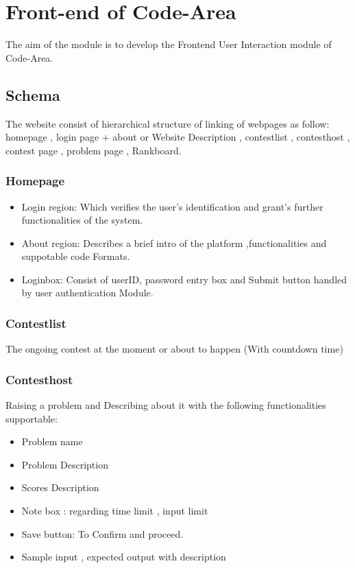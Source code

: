 

\newpage

\section{Front-end of Code-Area}
The aim of the module is to develop the Frontend User Interaction module of Code-Area.

\subsection{Schema}
The website consist of hierarchical structure of linking of webpages as follow:
homepage , login page + about or Website Description , contestlist , contesthost , contest page , problem page , Rankboard.

\subsubsection{Homepage}
\begin{itemize}

\item Login region: Which verifies the user’s identification and grant’s further functionalities of the system.
\item About region: Describes a brief intro of the platform ,functionalities and suppotable code Formats.
\item Loginbox: Consist of userID, password entry box and Submit button handled by user authentication Module.

\end{itemize}

\subsubsection{Contestlist}
The ongoing contest at the moment or about to happen (With countdown time)

\subsubsection{Contesthost}
Raising a problem and Describing about it with the following functionalities supportable:
\begin{itemize}
\item Problem name 
\item Problem Description
\item Scores Description
\item Note box : regarding time limit , input limit
\item Save button: To Confirm and proceed.
\item Sample input , expected output with description
\end{itemize}

